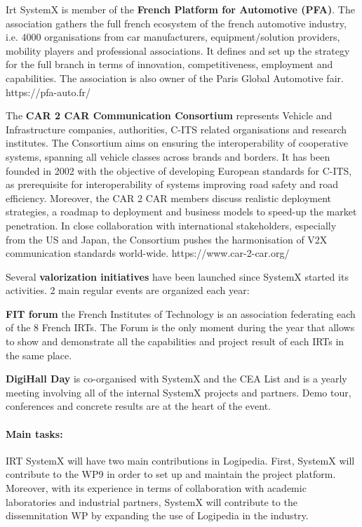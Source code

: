 \begin{sitedescription}{Irt}
SystemX is member of the {\bf French Platform for Automotive (PFA)}. The association gathers the full french ecosystem of the french automotive industry, i.e. 4000 organisations from car manufacturers, equipment/solution providers, mobility players and professional associations. It defines and set up the strategy for the full branch in terms of innovation, competitiveness, employment and capabilities. The association is also owner of the Paris Global Automotive fair. https://pfa-auto.fr/

The {\bf CAR 2 CAR Communication Consortium} represents Vehicle and Infrastructure companies, authorities, C-ITS related organisations and research institutes. The Consortium aims on ensuring the interoperability of cooperative systems, spanning all vehicle classes across brands and borders. It has been founded in 2002 with the objective of developing European standards for C-ITS, as prerequisite for interoperability of systems improving road safety and road efficiency. Moreover, the CAR 2 CAR members discuss realistic deployment strategies, a roadmap to deployment and business models to speed-up the market penetration. In close collaboration with international stakeholders, especially from the US and Japan, the Consortium pushes the harmonisation of V2X communication standards world-wide. https://www.car-2-car.org/

Several {\bf valorization initiatives} have been launched since SystemX started its activities. 2 main regular events are organized each year:
\begin{compactitem}
\item {\bf FIT forum} the French Institutes of Technology is an association federating each of the 8 French IRTs. The Forum is the only moment during the year that allows to show and demonstrate all the capabilities and project result of each IRTs in the same place.
\item {\bf DigiHall Day} is co-organised with SystemX and the CEA List and is a yearly meeting involving all of the internal SystemX projects and partners. Demo tour, conferences and concrete results are at the heart of the event.
\end{compactitem}




\paragraph*{Main tasks:}

IRT SystemX will have two main contributions in Logipedia. First, SystemX will contribute to the WP9 in order to set up and maintain the project platform. Moreover, with its experience in terms of collaboration with academic laboratories and industrial partners, SystemX will contribute to the dissemnitation WP by expanding the use of Logipedia in the industry.


\end{sitedescription}
